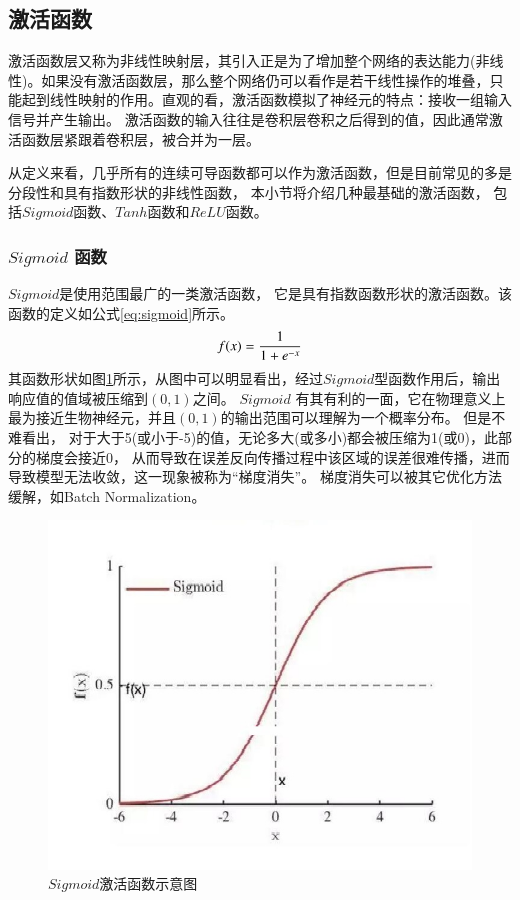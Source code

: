 \subsection{激活函数}

激活函数层又称为非线性映射层，其引入正是为了增加整个网络的表达能力(非线性)。如果没有激活函数层，那么整个网络仍可以看作是若干线性操作的堆叠，只能起到线性映射的作用。直观的看，激活函数模拟了神经元的特点：接收一组输入信号并产生输出。
激活函数的输入往往是卷积层卷积之后得到的值，因此通常激活函数层紧跟着卷积层，被合并为一层。

从定义来看，几乎所有的连续可导函数都可以作为激活函数，但是目前常见的多是分段性和具有指数形状的非线性函数，
本小节将介绍几种最基础的激活函数，
包括$Sigmoid$\cite{魏秀参解析卷积神经网络}函数、$Tanh$\cite{魏秀参解析卷积神经网络}函数和$ReLU$\cite{魏秀参解析卷积神经网络}函数。

\subsubsection{$Sigmoid$ 函数}

$Sigmoid$是使用范围最广的一类激活函数，
它是具有指数函数形状的激活函数。该函数的定义如公式\eqref{eq:sigmoid}所示。
\begin{equation}
\centering
f(x)=\frac{1}{1+e^{-x}}
\label{eq:sigmoid}
\end{equation}
其函数形状如图\ref{fig:Sigmoid}所示，从图中可以明显看出，经过$Sigmoid$型函数作用后，输出响应值的值域被压缩到$(0,1)$之间。
$Sigmoid$ 有其有利的一面，它在物理意义上最为接近生物神经元，并且$(0,1)$的输出范围可以理解为一个概率分布。
但是不难看出，
对于大于5(或小于-5)的值，无论多大(或多小)都会被压缩为1(或0)，此部分的梯度会接近0，
从而导致在误差反向传播过程中该区域的误差很难传播，进而导致模型无法收敛，这一现象被称为“梯度消失”。
梯度消失可以被其它优化方法缓解，如Batch Normalization\cite{ioffe2015batch}。
\begin{figure}[htbp]
\centering
\includegraphics[width=0.6\linewidth]{figures/sigmoid.png} 
\caption{$Sigmoid$激活函数示意图}
\label{fig:Sigmoid}
\end{figure} 

